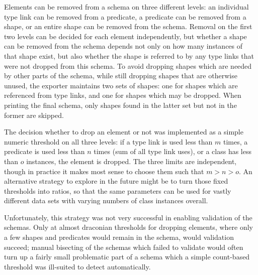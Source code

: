 
Elements can be removed from a \gls{schema} on three different levels:
an individual type link can be removed from a \gls{predicate}, %
a \gls{predicate} can be removed from a \gls{shape},
or an entire \gls{shape} can be removed from the \gls{schema}.
Removal on the first two levels can be decided for each element independently,
but whether a \gls{shape} can be removed from the \gls{schema} depends not only on how many instances of that \gls{shape} exist,
but also whether the \gls{shape} is referred to by any type links that were not dropped from this \gls{schema}.
To avoid dropping \glspl{shape} which are needed by other parts of the \gls{schema},
while still dropping \glspl{shape} that are otherwise unused,
the exporter maintains two sets of \glspl{shape}:
one for \glspl{shape} which are referenced from type links,
and one for \glspl{shape} which may be dropped.
When printing the final \gls{schema}, only \glspl{shape} found in the latter set but not in the former are skipped.

The decision whether to drop an element or not
was implemented as a simple numeric threshold on all three levels:
if a type link is used less than $m$ times,
a \gls{predicate} is used less than $n$ times (sum of all type link uses),
or a class has less than $o$ instances,
the element is dropped.
The three limits are independent,
though in practice it makes most sense to choose them such that $m > n > o$.
An alternative strategy to explore in the future might be
to turn those fixed thresholds into ratios,
so that the same parameters can be used for vastly different data sets
with varying numbers of class instances overall.

Unfortunately, this strategy was not very successful in enabling validation of the \glspl{schema}.
Only at almost draconian thresholds for dropping elements,
where only a few \glspl{shape} and \glspl{predicate} would remain in the \gls{schema},
would validation succeed;
manual bisecting of the \glspl{schema} which failed to validate
would often turn up a fairly small problematic part of a \gls{schema}
which a simple count-based threshold was ill-suited to detect automatically.


